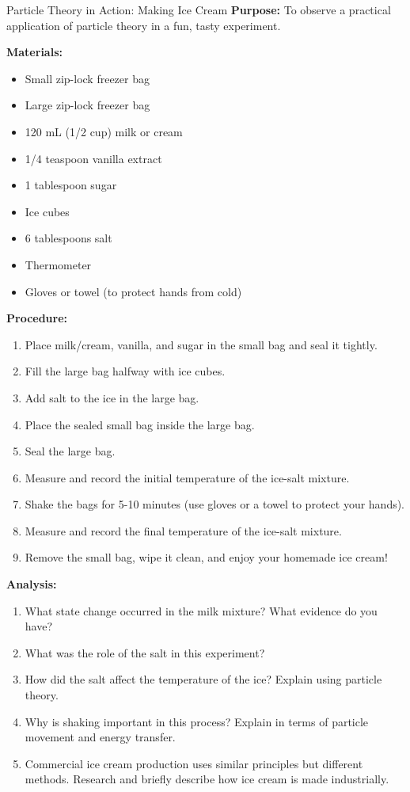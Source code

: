 \begin{investigation}{Particle Theory in Action: Making Ice Cream}
\textbf{Purpose:} To observe a practical application of particle theory in a fun, tasty experiment.

\textbf{Materials:}
\begin{itemize}
    \item Small zip-lock freezer bag
    \item Large zip-lock freezer bag
    \item 120 mL (1/2 cup) milk or cream
    \item 1/4 teaspoon vanilla extract
    \item 1 tablespoon sugar
    \item Ice cubes
    \item 6 tablespoons salt
    \item Thermometer
    \item Gloves or towel (to protect hands from cold)
\end{itemize}

\textbf{Procedure:}
\begin{enumerate}
    \item Place milk/cream, vanilla, and sugar in the small bag and seal it tightly.
    \item Fill the large bag halfway with ice cubes.
    \item Add salt to the ice in the large bag.
    \item Place the sealed small bag inside the large bag.
    \item Seal the large bag.
    \item Measure and record the initial temperature of the ice-salt mixture.
    \item Shake the bags for 5-10 minutes (use gloves or a towel to protect your hands).
    \item Measure and record the final temperature of the ice-salt mixture.
    \item Remove the small bag, wipe it clean, and enjoy your homemade ice cream!
\end{enumerate}

\textbf{Analysis:}
\begin{enumerate}
    \item What state change occurred in the milk mixture? What evidence do you have?
    \item What was the role of the salt in this experiment?
    \item How did the salt affect the temperature of the ice? Explain using particle theory.
    \item Why is shaking important in this process? Explain in terms of particle movement and energy transfer.
    \item Commercial ice cream production uses similar principles but different methods. Research and briefly describe how ice cream is made industrially.
\end{enumerate}
\end{investigation}

